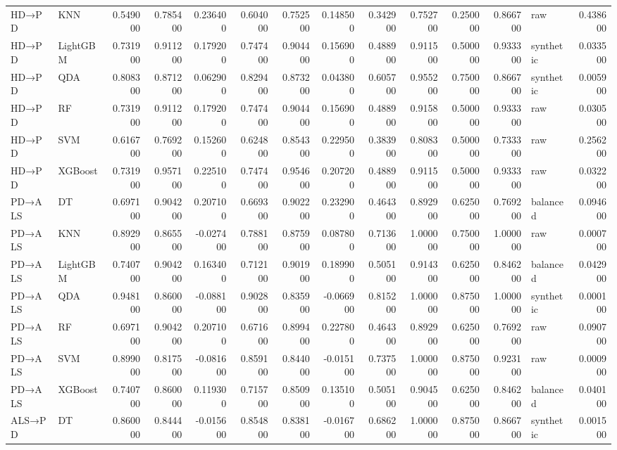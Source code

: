 \begin{longtable}{llrrrrrrrrrrlr}
HD→PD & KNN & 0.549000 & 0.785400 & 0.236400 & 0.604000 & 0.752500 & 0.148500 & 0.342900 & 0.752700 & 0.250000 & 0.866700 & raw & 0.438600 \\
HD→PD & LightGBM & 0.731900 & 0.911200 & 0.179200 & 0.747400 & 0.904400 & 0.156900 & 0.488900 & 0.911500 & 0.500000 & 0.933300 & synthetic & 0.033500 \\
HD→PD & QDA & 0.808300 & 0.871200 & 0.062900 & 0.829400 & 0.873200 & 0.043800 & 0.605700 & 0.955200 & 0.750000 & 0.866700 & synthetic & 0.005900 \\
HD→PD & RF & 0.731900 & 0.911200 & 0.179200 & 0.747400 & 0.904400 & 0.156900 & 0.488900 & 0.915800 & 0.500000 & 0.933300 & raw & 0.030500 \\
HD→PD & SVM & 0.616700 & 0.769200 & 0.152600 & 0.624800 & 0.854300 & 0.229500 & 0.383900 & 0.808300 & 0.500000 & 0.733300 & raw & 0.256200 \\
HD→PD & XGBoost & 0.731900 & 0.957100 & 0.225100 & 0.747400 & 0.954600 & 0.207200 & 0.488900 & 0.911500 & 0.500000 & 0.933300 & raw & 0.032200 \\
PD→ALS & DT & 0.697100 & 0.904200 & 0.207100 & 0.669300 & 0.902200 & 0.232900 & 0.464300 & 0.892900 & 0.625000 & 0.769200 & balanced & 0.094600 \\
PD→ALS & KNN & 0.892900 & 0.865500 & -0.027400 & 0.788100 & 0.875900 & 0.087800 & 0.713600 & 1.000000 & 0.750000 & 1.000000 & raw & 0.000700 \\
PD→ALS & LightGBM & 0.740700 & 0.904200 & 0.163400 & 0.712100 & 0.901900 & 0.189900 & 0.505100 & 0.914300 & 0.625000 & 0.846200 & balanced & 0.042900 \\
PD→ALS & QDA & 0.948100 & 0.860000 & -0.088100 & 0.902800 & 0.835900 & -0.066900 & 0.815200 & 1.000000 & 0.875000 & 1.000000 & synthetic & 0.000100 \\
PD→ALS & RF & 0.697100 & 0.904200 & 0.207100 & 0.671600 & 0.899400 & 0.227800 & 0.464300 & 0.892900 & 0.625000 & 0.769200 & raw & 0.090700 \\
PD→ALS & SVM & 0.899000 & 0.817500 & -0.081600 & 0.859100 & 0.844000 & -0.015100 & 0.737500 & 1.000000 & 0.875000 & 0.923100 & raw & 0.000900 \\
PD→ALS & XGBoost & 0.740700 & 0.860000 & 0.119300 & 0.715700 & 0.850900 & 0.135100 & 0.505100 & 0.904500 & 0.625000 & 0.846200 & balanced & 0.040100 \\
ALS→PD & DT & 0.860000 & 0.844400 & -0.015600 & 0.854800 & 0.838100 & -0.016700 & 0.686200 & 1.000000 & 0.875000 & 0.866700 & synthetic & 0.001500 \\

\end{longtable}

